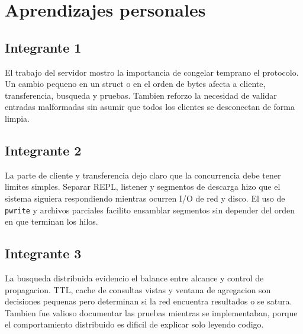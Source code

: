 \section{Aprendizajes personales}

\subsection*{Integrante 1}
El trabajo del servidor mostro la importancia de congelar temprano el
protocolo. Un cambio pequeno en un struct o en el orden de bytes afecta a
cliente, transferencia, busqueda y pruebas. Tambien reforzo la necesidad de
validar entradas malformadas sin asumir que todos los clientes se desconectan
de forma limpia.

\subsection*{Integrante 2}
La parte de cliente y transferencia dejo claro que la concurrencia debe tener
limites simples. Separar REPL, listener y segmentos de descarga hizo que el
sistema siguiera respondiendo mientras ocurren I/O de red y disco. El uso de
\texttt{pwrite} y archivos parciales facilito ensamblar segmentos sin depender
del orden en que terminan los hilos.

\subsection*{Integrante 3}
La busqueda distribuida evidencio el balance entre alcance y control de
propagacion. TTL, cache de consultas vistas y ventana de agregacion son
decisiones pequenas pero determinan si la red encuentra resultados o se satura.
Tambien fue valioso documentar las pruebas mientras se implementaban, porque
el comportamiento distribuido es dificil de explicar solo leyendo codigo.
